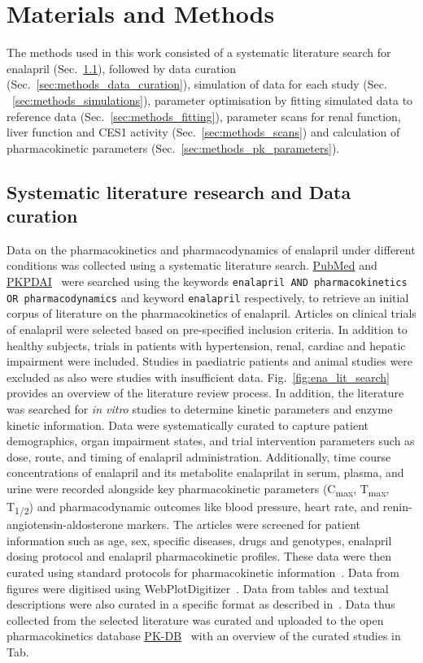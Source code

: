 \documentclass[pharmaceutics,article,submit,pdftex,moreauthors]{Definitions/mdpi}
\begin{document}
\section{Materials and Methods}
The methods used in this work consisted of a systematic literature search for enalapril (Sec.~\ref{sec:methods_lit_search_data_curate}), followed by data curation (Sec.~\ref{sec:methods_data_curation}), simulation of data for each study (Sec. ~\ref{sec:methods_simulations}), parameter optimisation by fitting simulated data to reference data (Sec.~\ref{sec:methods_fitting}), parameter scans for renal function, liver function and CES1 activity (Sec.~\ref{sec:methods_scans}) and calculation of pharmacokinetic parameters (Sec.~\ref{sec:methods_pk_parameters}).

\subsection{Systematic literature research and Data curation}
\label{sec:methods_lit_search_data_curate} 
Data on the pharmacokinetics and pharmacodynamics of enalapril under different conditions was collected using a systematic literature search. \href{https://pubmed.ncbi.nlm.nih.gov/}{PubMed} and \href{https://www.pkpdai.com/}{PKPDAI}~\cite{GonzalezHernandez2021} were searched using the keywords \texttt{enalapril AND pharmacokinetics OR pharmacodynamics} and keyword \texttt{enalapril} respectively, to retrieve an initial corpus of literature on the pharmacokinetics of enalapril. Articles on clinical trials of enalapril were selected based on pre-specified inclusion criteria. In addition to healthy subjects, trials in patients with hypertension, renal, cardiac and hepatic impairment were included. Studies in paediatric patients and animal studies were excluded as also were studies with insufficient data. Fig.~\ref{fig:ena_lit_search} provides an overview of the literature review process. In addition, the literature was searched for \textit{in vitro} studies to determine kinetic parameters and enzyme kinetic information. Data were systematically curated to capture patient demographics, organ impairment states, and trial intervention parameters such as dose, route, and timing of enalapril administration. Additionally, time course concentrations of enalapril and its metabolite enalaprilat in serum, plasma, and urine were recorded alongside key pharmacokinetic parameters (C\textsubscript{max}, T\textsubscript{max}, T\textsubscript{1/2}) and pharmacodynamic outcomes like blood pressure, heart rate, and renin-angiotensin-aldosterone markers. The articles were screened for patient information such as age, sex, specific diseases, drugs and genotypes, enalapril dosing protocol and enalapril pharmacokinetic profiles. These data were then curated using standard protocols for pharmacokinetic information~\cite{Grzegorzewski2021}. Data from figures were digitised using WebPlotDigitizer~\cite{Rohatgi2024}. Data from tables and textual descriptions were also curated in a specific format as described in~\cite{Grzegorzewski2021}. Data thus collected from the selected literature was curated and uploaded to the open pharmacokinetics database \href{https://alpha.pk-db.com/}{PK-DB}~\cite{Grzegorzewski2021} with an overview of the curated studies in Tab.
\end{document}
